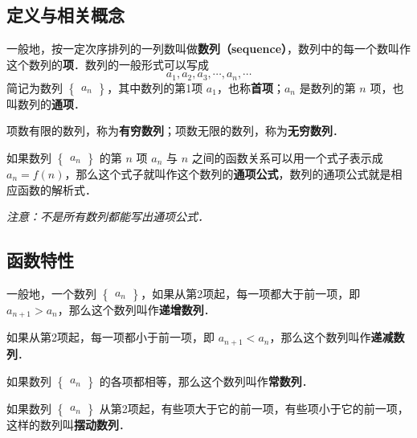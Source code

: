 

\subsection{定义与相关概念}
一般地，按一定次序排列的一列数叫做\textbf{数列（sequence）}，数列中的每一个数叫作这个数列的\textbf{项}．数列的一般形式可以写成
\begin{equation}
a_1,a_2,a_3,\cdots,a_n,\cdots
\end{equation}
简记为数列 $\begin{Bmatrix} a_n \end{Bmatrix}$，其中数列的第1项 $a_1$，也称\textbf{首项}；$a_n$ 是数列的第 $n$ 项，也叫数列的\textbf{通项}．

项数有限的数列，称为\textbf{有穷数列}；项数无限的数列，称为\textbf{无穷数列}．

如果数列 $\begin{Bmatrix} a_n \end{Bmatrix}$ 的第 $n$ 项 $a_n$ 与 $n$ 之间的函数关系可以用一个式子表示成 $a_n = f(n)$，那么这个式子就叫作这个数列的\textbf{通项公式}，数列的通项公式就是相应函数的解析式．

\textsl{注意：不是所有数列都能写出通项公式．}

\subsection{函数特性}
一般地，一个数列 $\begin{Bmatrix} a_n \end{Bmatrix}$，如果从第2项起，每一项都大于前一项，即 $a_{n+1}>a_n$，那么这个数列叫作\textbf{递增数列}．

如果从第2项起，每一项都小于前一项，即 $a_{n+1}<a_n$，那么这个数列叫作\textbf{递减数列}．

如果数列 $\begin{Bmatrix} a_n \end{Bmatrix}$ 的各项都相等，那么这个数列叫作\textbf{常数列}．

如果数列 $\begin{Bmatrix} a_n \end{Bmatrix}$ 从第2项起，有些项大于它的前一项，有些项小于它的前一项，这样的数列叫\textbf{摆动数列}．